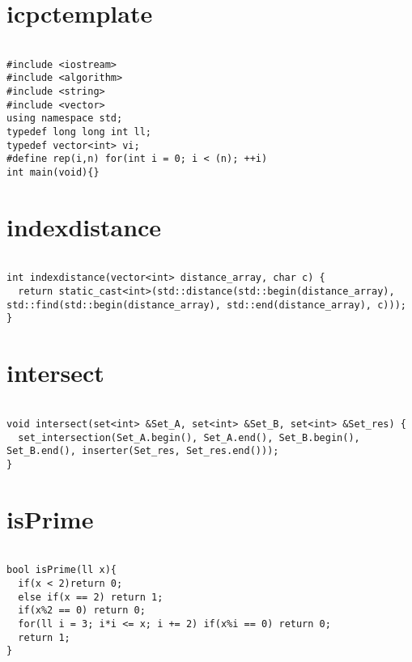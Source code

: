 \documentclass[a4j,titlepage]{jarticle} %
\begin{document}
\color{white}
\section{icpctemplate}
\color{black}
\begin{lstlisting}[caption=icpctemplate]

#include <iostream>
#include <algorithm>
#include <string>
#include <vector>
using namespace std;
typedef long long int ll;
typedef vector<int> vi;
#define rep(i,n) for(int i = 0; i < (n); ++i)
int main(void){}

\end{lstlisting}

\color{white}
\section{indexdistance}
\color{black}
\begin{lstlisting}[caption=indexdistance]

int indexdistance(vector<int> distance_array, char c) {
  return static_cast<int>(std::distance(std::begin(distance_array), std::find(std::begin(distance_array), std::end(distance_array), c)));
}

\end{lstlisting}

\color{white}
\section{intersect}
\color{black}
\begin{lstlisting}[caption=intersect]

void intersect(set<int> &Set_A, set<int> &Set_B, set<int> &Set_res) {
  set_intersection(Set_A.begin(), Set_A.end(), Set_B.begin(), Set_B.end(), inserter(Set_res, Set_res.end()));
}

\end{lstlisting}

\color{white}
\section{isPrime}
\color{black}
\begin{lstlisting}[caption=isPrime]

bool isPrime(ll x){
  if(x < 2)return 0;
  else if(x == 2) return 1;
  if(x%2 == 0) return 0;
  for(ll i = 3; i*i <= x; i += 2) if(x%i == 0) return 0;
  return 1;
}

\end{lstlisting}
\end{document}
